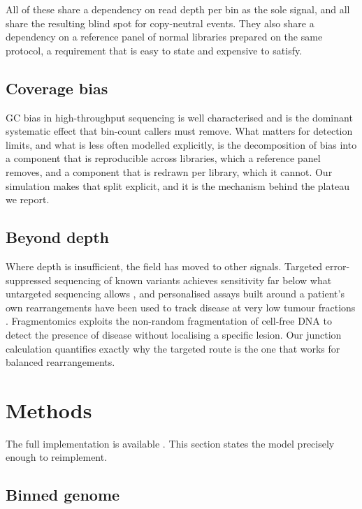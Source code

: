 \documentclass[conference]{IEEEtran}
\begin{document}
All of these share a dependency on read depth per bin as the sole signal, and
all share the resulting blind spot for copy-neutral events. They also share a
dependency on a reference panel of normal libraries prepared on the same
protocol, a requirement that is easy to state and expensive to satisfy.

\subsection{Coverage bias}

GC bias in high-throughput sequencing is well characterised
\cite{benjamini2012gcbias} and is the dominant systematic effect that
bin-count callers must remove. What matters for detection limits, and what is
less often modelled explicitly, is the decomposition of bias into a component
that is reproducible across libraries, which a reference panel removes, and a
component that is redrawn per library, which it cannot. Our simulation makes
that split explicit, and it is the mechanism behind the plateau we report.

\subsection{Beyond depth}

Where depth is insufficient, the field has moved to other signals. Targeted
error-suppressed sequencing of known variants achieves sensitivity far below
what untargeted sequencing allows \cite{newman2016capp}, and personalised
assays built around a patient's own rearrangements have been used to track
disease at very low tumour fractions \cite{abbosh2017phylogenetic}.
Fragmentomics exploits the non-random fragmentation of cell-free DNA
\cite{snyder2016cellfree, cristiano2019fragmentation} to detect the presence of
disease without localising a specific lesion. Our junction calculation
quantifies exactly why the targeted route is the one that works for balanced
rearrangements.

\section{Methods}

The full implementation is available \cite{lpcfdna2026}. This section states the
model precisely enough to reimplement.

\subsection{Binned genome}
\end{document}

